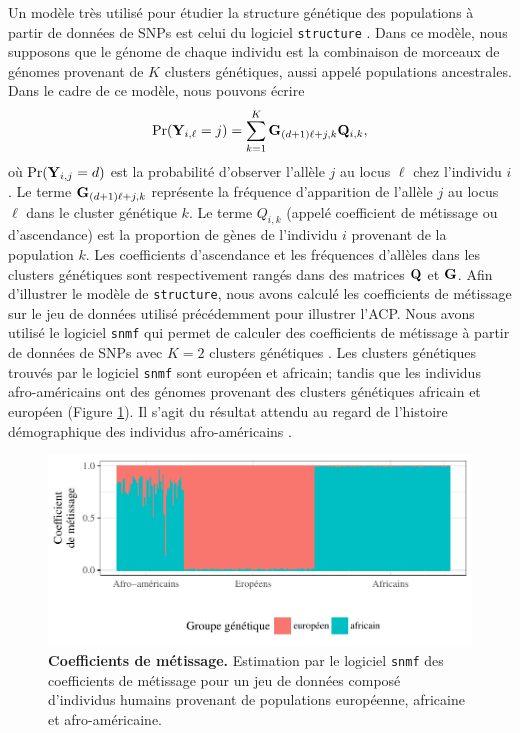 \documentclass[12pt,a4paper,twoside]{ugathesis}
\begin{document}
Un modèle très utilisé pour étudier la structure génétique des populations à
partir de données de SNPs est celui du logiciel \texttt{structure} \citep{Pritchard2000}.
Dans ce modèle, nous supposons que le génome de chaque individu est la
combinaison de morceaux de génomes provenant de \(K\) clusters génétiques, aussi
appelé populations ancestrales. Dans le cadre de ce modèle, nous pouvons écrire
\begin{equation}
\label{eq:structure}
\Pr(\mathbf{Y}_{i,\ell} = j) = \sum_{k = 1}^{K} \mathbf{G}_{(d + 1)\ell + j, k} \mathbf{Q}_{i,k},
\end{equation}
où \(\Pr(\mathbf{Y}_{i,j} = d)\) est la probabilité d'observer l'allèle \(j\) au locus
\(\ell\) chez l'individu \(i\). Le terme \(\mathbf{G}_{(d + 1)\ell + j, k}\) représente la
fréquence d'apparition de l'allèle \(j\) au locus \(\ell\) dans le cluster génétique
\(k\). Le terme \(Q_{i,k}\) (appelé coefficient de métissage ou d'ascendance) est la
proportion de gènes de l'individu \(i\) provenant de la population \(k\). Les
coefficients d'ascendance et les fréquences d'allèles dans les clusters
génétiques sont respectivement rangés dans des matrices \(\mathbf{Q}\) et \(\mathbf{G}\). Afin
d'illustrer le modèle de \texttt{structure}, nous avons calculé les coefficients de
métissage sur le jeu de données utilisé précédemment pour illustrer l'ACP. Nous
avons utilisé le logiciel \texttt{snmf} qui permet de calculer des coefficients de
métissage à partir de données de SNPs avec \(K = 2\) clusters génétiques
\citep{Frichot_2015}. Les clusters génétiques trouvés par le logiciel \texttt{snmf} sont
européen et africain; tandis que les individus afro-américains ont des génomes
provenant des clusters génétiques africain et européen (Figure
\ref{fig:tess3_intro}). Il s'agit du résultat attendu au regard de l'histoire
démographique des individus afro-américains \citep{tishkoff2009genetic}.

\begin{figure}[h]
\centering
\includegraphics{./OUTPUT/Rplots/tess3_intro_barplot.pdf}
\caption{{\bf Coefficients de métissage.} Estimation par le logiciel
  \texttt{snmf} des coefficients de métissage pour un jeu de données composé
  d'individus humains provenant de populations européenne, africaine et
  afro-américaine.}
\label{fig:tess3_intro}
\end{figure}
\end{document}
